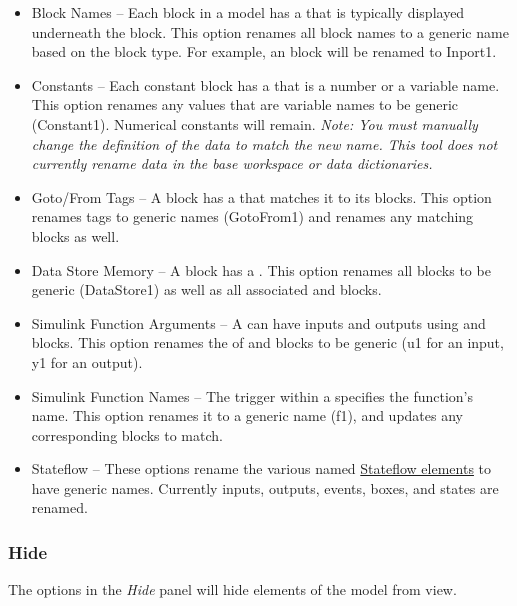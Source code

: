 \documentclass{article}
\begin{document}
\begin{itemize}
	\item Block Names -- Each block in a model has a  that is typically displayed underneath the block. This option renames all block names to a generic name based on the block type. For example, an \inport block will be renamed to Inport1.
	
	\item Constants -- Each constant block has a  that is a number or a variable name. This option renames any values that are variable names to be generic (\eg Constant1). Numerical constants will remain. \emph{Note: You must manually change the definition of the data to match the new name. This tool does not currently rename data in the base workspace or data dictionaries.}
	
	\item Goto/From Tags -- A \goto block has a  that matches it to its \from blocks. This option renames tags to generic names (\eg GotoFrom1) and renames any matching \from blocks as well.
	
	\item Data Store Memory -- A \DSM block has a . This option renames all  \DSM blocks to be generic (\eg DataStore1) as well as all associated \DSR and \DSW blocks.
	
	\item Simulink Function Arguments -- A \simfunc can have inputs and outputs using \argin and \argout blocks. This option renames the  of \argin and \argout blocks to be generic (\eg u1 for an input, y1 for an output).

	\item Simulink Function Names -- The trigger within a \simfunc specifies the function's name. This option renames it to a generic name (\eg f1), and updates any corresponding \simfunccaller blocks to match.
	
	\item Stateflow -- These options rename the various named \href{https://www.mathworks.com/help/stateflow/ug/overview-of-stateflow-objects.html}{Stateflow elements} to have generic names. Currently inputs, outputs, events, boxes, and states are renamed.
\end{itemize}

\subsubsection{Hide}
\label{lbl:hide}
The options in the \emph{Hide} panel will hide elements of the model from view.
\end{document}

